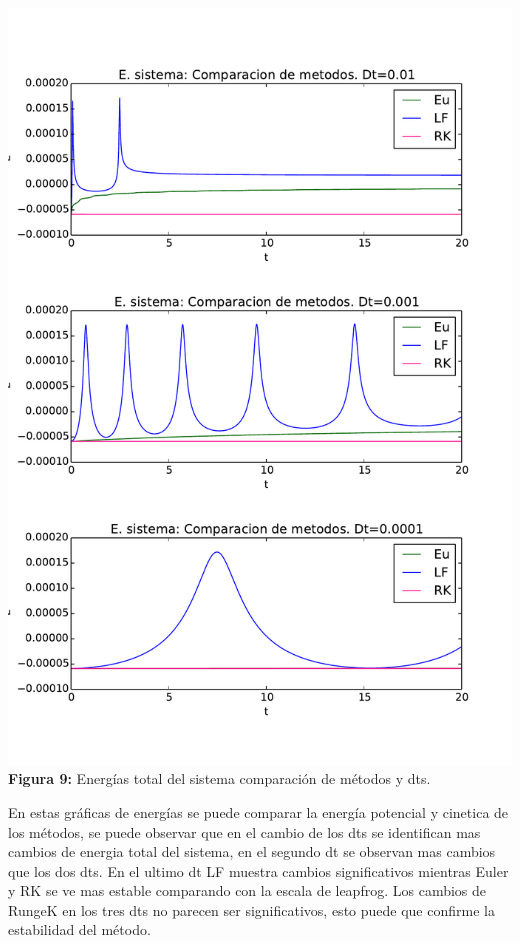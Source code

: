 \documentclass[11pt,letterpaper]{exam}
\begin{document}
\begin{center}
\includegraphics[width=16.cm]{Enertotal_met_dt.pdf}
\textbf{Figura 9:}{  Energ\'ias total del sistema comparaci\'on de m\'etodos y dts.}
\end{center}
{En estas gr\'aficas de energ\'ias se puede comparar la energ\'ia potencial y cinetica de los m\'etodos, se puede observar que en el cambio de los dts se identifican mas cambios de energia total del sistema, en el segundo dt se observan mas cambios que los dos dts. En el ultimo dt LF muestra cambios significativos mientras Euler y RK se ve mas estable comparando con la escala de leapfrog. Los cambios de RungeK en los tres dts no parecen ser significativos, esto puede que confirme la estabilidad del m\'etodo.}
\end{document}
